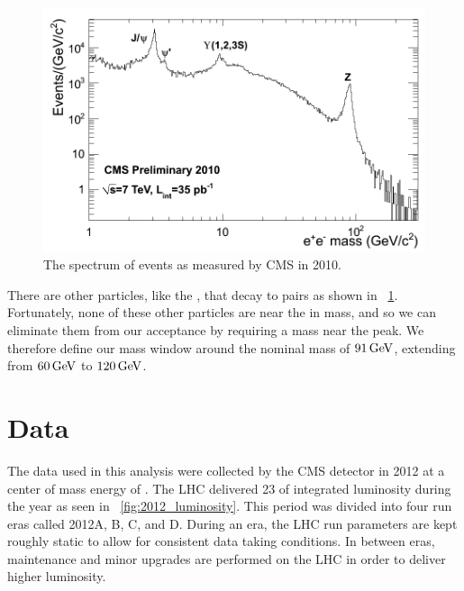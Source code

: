 \begin{figure}[tb]
    \centering
    \includegraphics[width=\textwidth]{figures/dielectron_mass_7tev.png}
    \caption{The spectrum of \ee events as measured by CMS in 2010.}
    \label{fig:ee_spectrum}
\end{figure}

There are other particles, like the \jpsi, that decay to \ee pairs as shown in
\FIG~\ref{fig:ee_spectrum}. Fortunately, none of these other particles are near
the \Z in mass, and so we can eliminate them from our acceptance by requiring a
mass near the \Z peak. We therefore define our mass window around the nominal
\Z mass of $91 \,\text{Ge\hspace{-.08em}V}$, extending from $60 \,\text{Ge\hspace{-.08em}V}$ to $120 \,\text{Ge\hspace{-.08em}V}$.

\section{Data}

The data used in this analysis were collected by the CMS detector in 2012 at a
center of mass energy of \rootseight. The LHC delivered 23 \fbinv of integrated
luminosity during the year as seen in \FIG~\ref{fig:2012_luminosity}. This
period was divided into four run eras called 2012A, B, C, and D. During an era,
the LHC run parameters are kept roughly static to allow for consistent data
taking conditions. In between eras, maintenance and minor upgrades are
performed on the LHC in order to deliver higher luminosity.

